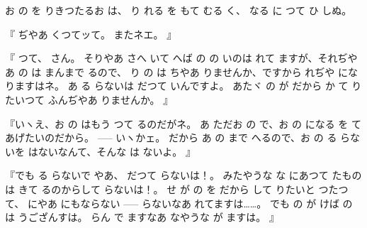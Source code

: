 お
の
を
りきつたるお
は、
り
れる
を
もて
むる
く、
なる
に
つて
ひ
しぬ。

『
ぢやあ
くつてッて。
またネエ。
』

『
つて、
さん。
そりやあ
さへ
いて
へば
の
の
いのは
れて
ますが、それぢやあ
の
は
まんまで
るので、
り
の
は
ちやあ
りませんか、ですから
れぢや
になりますはネ。
あ
る
らないは
だつて
いんですよ。
あたヾ
の
が
だから
か
て
りたいつて
ふんぢやあ
りませんか。
』

『いヽえ、お
の
はもう
つて
るのだがネ。
あ
ただお
の
で、お
の
になる
を
てあげたいのだから。
 \------ いヽかェ。
だから
あ
の
まで
へるので、お
の
る
らないを
はないなんて、そんな
は
ないよ。
』

『でも
る
らないで
やあ、
だつて
らないは！。
みたやうな
な
にあつて
たものは
きて
るのからして
らないは！。
せ
が
の
を
だから
して
りたいと
つたつて、
にやあ
にもならない \------
らないなあ
れてますは……。
でも
の
が
けば
の
は
うござんすは。
らん
で
ますなあ
なやうな
が
ますは。
』

